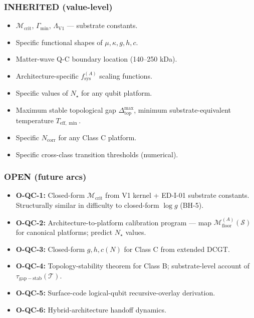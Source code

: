 \documentclass[
  11pt,
  a4paper,
]{article}
\providecommand{\tightlist}{%
  \setlength{\itemsep}{0pt}\setlength{\parskip}{0pt}}
\begin{document}
\subsubsection{INHERITED (value-level)}\label{inherited-value-level}

\begin{itemize}
\tightlist
\item
  \(\mathcal{M}_{\mathrm{crit}}\), \(\Gamma_{\mathrm{min}}\),
  \(\Lambda_{\mathrm{V1}}\) --- substrate constants.
\item
  Specific functional shapes of \(\mu, \kappa, g, h, c\).
\item
  Matter-wave Q-C boundary location (140--250 kDa).
\item
  Architecture-specific \(f_{\mathrm{sys}}^{(A)}\) scaling functions.
\item
  Specific values of \(N_\star\) for any qubit platform.
\item
  Maximum stable topological gap \(\Delta_{\mathrm{top}}^{\max}\),
  minimum substrate-equivalent temperature \(T_{\mathrm{eff,\min}}\).
\item
  Specific \(N_{\mathrm{corr}}\) for any Class C platform.
\item
  Specific cross-class transition thresholds (numerical).
\end{itemize}

\subsubsection{OPEN (future arcs)}\label{open-future-arcs}

\begin{itemize}
\tightlist
\item
  \textbf{O-QC-1:} Closed-form \(\mathcal{M}_{\mathrm{crit}}\) from V1
  kernel + ED-I-01 substrate constants. Structurally similar in
  difficulty to closed-form \(\log g\) (BH-5).
\item
  \textbf{O-QC-2:} Architecture-to-platform calibration program --- map
  \(\mathcal{M}_{\mathrm{floor}}^{(A)}(\mathcal{S})\) for canonical
  platforms; predict \(N_\star\) values.
\item
  \textbf{O-QC-3:} Closed-form \(g, h, c(N)\) for Class C from extended
  DCGT.
\item
  \textbf{O-QC-4:} Topology-stability theorem for Class B;
  substrate-level account of \(\tau_{\mathrm{gap-stab}}(\mathcal{T})\).
\item
  \textbf{O-QC-5:} Surface-code logical-qubit recursive-overlay
  derivation.
\item
  \textbf{O-QC-6:} Hybrid-architecture handoff dynamics.
\end{itemize}
\end{document}

